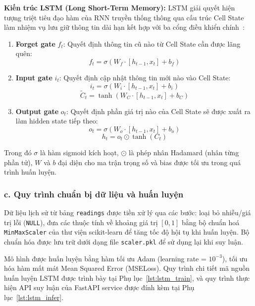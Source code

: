 \textbf{Kiến trúc LSTM (Long Short-Term Memory):} LSTM giải quyết hiện tượng triệt tiêu đạo hàm của RNN truyền thống thông qua cấu trúc Cell State làm nhiệm vụ lưu giữ thông tin dài hạn kết hợp với ba cổng điều khiển chính~\cite{hochreiter1997lstm}:
\begin{enumerate}[leftmargin=2cm]
  \item \textbf{Forget gate} $f_t$: Quyết định thông tin cũ nào từ Cell State cần được lãng quên:
    \begin{equation}
      f_t = \sigma(W_f \cdot [h_{t-1}, x_t] + b_f)
    \end{equation}
  \item \textbf{Input gate} $i_t$: Quyết định cập nhật thông tin mới nào vào Cell State:
    \begin{equation}
      i_t = \sigma(W_i \cdot [h_{t-1}, x_t] + b_i)
    \end{equation}
    \begin{equation}
      \tilde{C}_t = \tanh(W_C \cdot [h_{t-1}, x_t] + b_C)
    \end{equation}
  \item \textbf{Output gate} $o_t$: Quyết định phần giá trị nào của Cell State sẽ được xuất ra làm hidden state tiếp theo:
    \begin{equation}
      o_t = \sigma(W_o \cdot [h_{t-1}, x_t] + b_o)
    \end{equation}
    \begin{equation}
      h_t = o_t \odot \tanh(C_t)
    \end{equation}
\end{enumerate}
Trong đó $\sigma$ là hàm sigmoid kích hoạt, $\odot$ là phép nhân Hadamard (nhân từng phần tử), $W$ và $b$ đại diện cho ma trận trọng số và bias được tối ưu trong quá trình huấn luyện.

\subsubsection*{c. Quy trình chuẩn bị dữ liệu và huấn luyện}

Dữ liệu lịch sử từ bảng \texttt{readings} được tiền xử lý qua các bước: loại bỏ nhiễu/giá trị lỗi (\texttt{NULL}), đưa các thuộc tính về khoảng giá trị $[0, 1]$ bằng bộ chuẩn hoá \texttt{MinMaxScaler} của thư viện scikit-learn để tăng tốc độ hội tụ khi huấn luyện. Bộ chuẩn hóa được lưu trữ dưới dạng file \texttt{scaler.pkl} để sử dụng lại khi suy luận.

Mô hình được huấn luyện bằng hàm tối ưu Adam (learning rate = $10^{-3}$), tối ưu hóa hàm mất mát Mean Squared Error (MSELoss). Quy trình chi tiết mã nguồn huấn luyện LSTM được trình bày tại Phụ lục~\ref{lst:lstm_train}, và quy trình thực hiện API suy luận của FastAPI service được đính kèm tại Phụ lục~\ref{lst:lstm_infer}.


